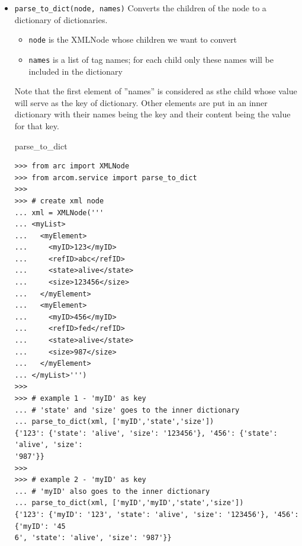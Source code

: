 \documentclass{article}
\begin{document}
\begin{flushleft}
\begin{itemize}
  \item{ \verb$parse_to_dict(node, names)$ \linebreak
  Converts the children of the node to a dictionary of dictionaries.
  \begin{itemize}
    \item{\verb$node$ is the XMLNode whose children we want to convert}
    \item{\verb$names$ is a list of tag names; for each child only these names will be included in the dictionary}
  \end{itemize}
  Note that the first element of ''names'' is considered as sthe child whose value will serve as the key of dictionary.
  Other elements are put in an inner dictionary with their names being the key and their content being the value for that key.
    \begin{example}
      \caption{parse\_to\_dict}\label{p2dex}
\begin{verbatim}
>>> from arc import XMLNode
>>> from arcom.service import parse_to_dict
>>> 
>>> # create xml node
... xml = XMLNode('''
... <myList>
...   <myElement>
...     <myID>123</myID>
...     <refID>abc</refID>
...     <state>alive</state>
...     <size>123456</size>
...   </myElement>
...   <myElement>
...     <myID>456</myID>
...     <refID>fed</refID>
...     <state>alive</state>
...     <size>987</size>
...   </myElement>
... </myList>''')
>>> 
>>> # example 1 - 'myID' as key
... # 'state' and 'size' goes to the inner dictionary
... parse_to_dict(xml, ['myID','state','size'])
{'123': {'state': 'alive', 'size': '123456'}, '456': {'state': 'alive', 'size': 
'987'}}
>>> 
>>> # example 2 - 'myID' as key
... # 'myID' also goes to the inner dictionary
... parse_to_dict(xml, ['myID','myID','state','size'])
{'123': {'myID': '123', 'state': 'alive', 'size': '123456'}, '456': {'myID': '45
6', 'state': 'alive', 'size': '987'}}
\end{verbatim}
    \end{example}
  }
\end{itemize}


\end{flushleft}
\end{document}
